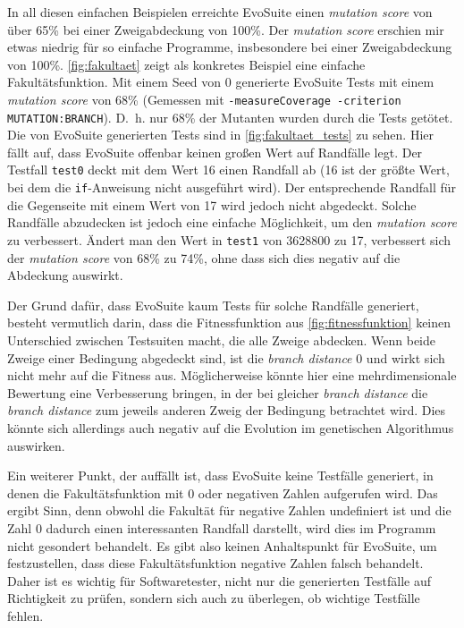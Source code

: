 \documentclass[a4paper,11pt]{article}
\begin{document}
In all diesen einfachen Beispielen erreichte EvoSuite einen \textit{mutation score} von über 65\% bei einer Zweigabdeckung von 100\%.
Der \textit{mutation score} erschien mir etwas niedrig für so einfache Programme, insbesondere bei einer Zweigabdeckung von 100\%.
\cref{fig:fakultaet} zeigt als konkretes Beispiel eine einfache Fakultätsfunktion.
Mit einem Seed von 0 generierte EvoSuite Tests mit einem \textit{mutation score} von 68\% (Gemessen mit \texttt{-measureCoverage -criterion MUTATION:BRANCH}).
D.~h. nur 68\% der Mutanten wurden durch die Tests getötet.
Die von EvoSuite generierten Tests sind in \cref{fig:fakultaet_tests} zu sehen.
Hier fällt auf, dass EvoSuite offenbar keinen großen Wert auf Randfälle legt.
Der Testfall \texttt{test0} deckt mit dem Wert 16 einen Randfall ab (16 ist der größte Wert, bei dem die \lstinline{if}-Anweisung nicht ausgeführt wird).
Der entsprechende Randfall für die Gegenseite mit einem Wert von 17 wird jedoch nicht abgedeckt.
Solche Randfälle abzudecken ist jedoch eine einfache Möglichkeit, um den \textit{mutation score} zu verbessert.
Ändert man den Wert in \texttt{test1} von 3628800 zu 17, verbessert sich der \textit{mutation score} von 68\% zu 74\%, ohne dass sich dies negativ auf die Abdeckung auswirkt.

Der Grund dafür, dass EvoSuite kaum Tests für solche Randfälle generiert, besteht vermutlich darin, dass die Fitnessfunktion aus \cref{fig:fitnessfunktion} keinen Unterschied zwischen Testsuiten macht, die alle Zweige abdecken.
Wenn beide Zweige einer Bedingung abgedeckt sind, ist die \textit{branch distance} 0 und wirkt sich nicht mehr auf die Fitness aus.
Möglicherweise könnte hier eine mehrdimensionale Bewertung eine Verbesserung bringen, in der bei gleicher \textit{branch distance} die \textit{branch distance} zum jeweils anderen Zweig der Bedingung betrachtet wird.
Dies könnte sich allerdings auch negativ auf die Evolution im genetischen Algorithmus auswirken.

Ein weiterer Punkt, der auffällt ist, dass EvoSuite keine Testfälle generiert, in denen die Fakultätsfunktion mit 0 oder negativen Zahlen aufgerufen wird.
Das ergibt Sinn, denn obwohl die Fakultät für negative Zahlen undefiniert ist und die Zahl 0 dadurch einen interessanten Randfall darstellt, wird dies im Programm nicht gesondert behandelt.
Es gibt also keinen Anhaltspunkt für EvoSuite, um festzustellen, dass diese Fakultätsfunktion negative Zahlen falsch behandelt.
Daher ist es wichtig für Softwaretester, nicht nur die generierten Testfälle auf Richtigkeit zu prüfen, sondern sich auch zu überlegen, ob wichtige Testfälle fehlen.
\end{document}
